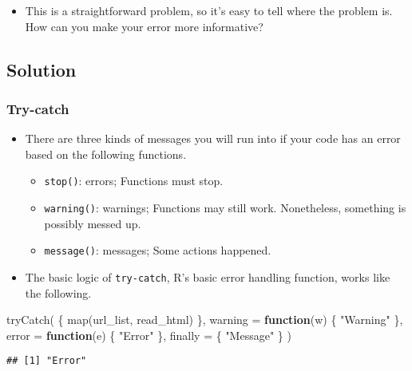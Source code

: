 \documentclass[
]{book}
\newenvironment{Shaded}{\begin{snugshade}}{\end{snugshade}}
\newcommand{\AttributeTok}[1]{\textcolor[rgb]{0.77,0.63,0.00}{#1}}
\newcommand{\ControlFlowTok}[1]{\textcolor[rgb]{0.13,0.29,0.53}{\textbf{#1}}}
\newcommand{\FunctionTok}[1]{\textcolor[rgb]{0.00,0.00,0.00}{#1}}
\newcommand{\NormalTok}[1]{#1}
\newcommand{\StringTok}[1]{\textcolor[rgb]{0.31,0.60,0.02}{#1}}
\providecommand{\tightlist}{%
  \setlength{\itemsep}{0pt}\setlength{\parskip}{0pt}}
\begin{document}
\begin{itemize}
\tightlist
\item
  This is a straightforward problem, so it's easy to tell where the problem is. How can you make your error more informative?
\end{itemize}

\hypertarget{solution-1}{%
\subsection{Solution}\label{solution-1}}

\hypertarget{try-catch}{%
\subsubsection{Try-catch}\label{try-catch}}

\begin{itemize}
\item
  There are three kinds of messages you will run into if your code has an error based on the following functions.

  \begin{itemize}
  \tightlist
  \item
    \texttt{stop()}: errors; Functions must stop.
  \item
    \texttt{warning()}: warnings; Functions may still work. Nonetheless, something is possibly messed up.
  \item
    \texttt{message()}: messages; Some actions happened.
  \end{itemize}
\item
  The basic logic of \texttt{try-catch}, R's basic error handling function, works like the following.
\end{itemize}

\begin{Shaded}
\begin{Highlighting}[]
\FunctionTok{tryCatch}\NormalTok{(}
\NormalTok{  \{}
    \FunctionTok{map}\NormalTok{(url\_list, read\_html)}
\NormalTok{  \},}
  \AttributeTok{warning =} \ControlFlowTok{function}\NormalTok{(w) \{}
    \StringTok{"Warning"}
\NormalTok{  \},}
  \AttributeTok{error =} \ControlFlowTok{function}\NormalTok{(e) \{}
    \StringTok{"Error"}
\NormalTok{  \},}
  \AttributeTok{finally =}\NormalTok{ \{}
    \StringTok{"Message"}
\NormalTok{  \}}
\NormalTok{)}
\end{Highlighting}
\end{Shaded}

\begin{verbatim}
## [1] "Error"
\end{verbatim}
\end{document}
